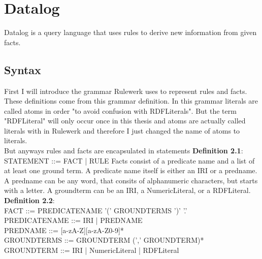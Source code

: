 \documentclass[hyperref, bachelorofscience]{cgvpub}
\renewenvironment{shaded}{%
  \def\FrameCommand{\fboxsep=\FrameSep \colorbox{shadecolor}}%
  \MakeFramed{\advance\hsize-\width \FrameRestore\FrameRestore}}%
 {\endMakeFramed}
\begin{document}
\section{Datalog}

Datalog is a query language that uses rules to derive new information from given facts. 
\subsection{Syntax}
First I will introduce the grammar Rulewerk uses to represent rules and facts. These definitions come from this \cite{MG2020} grammar definition. In this grammar literals are called atoms in order "to avoid confusion with RDFLiterals". But the term "RDFLiteral" will only occur once in this thesis and atoms are actually called literals with in Rulewerk and therefore I just changed the name of atoms to literals.  \\
But anyways rules and facts are encapsulated in statements 
\begin{shaded}
\textbf{Definition 2.1}: \\
STATEMENT ::= FACT | RULE
\end{shaded}
Facts consist of a predicate name and a list of at least one ground term. A predicate name itself is either an IRI
or a predname. A predname can be any word, that consits of alphanumeric characters, but starts with a letter. A groundterm can be an IRI, a NumericLiteral, or a RDFLiteral.
\begin{shaded}
\textbf{Definition 2.2}: \\
FACT                   ::= PREDICATENAME '(' GROUNDTERMS ')' '.' \\
PREDICATENAME          ::= IRI | PREDNAME \\
PREDNAME               ::= [a-zA-Z][a-zA-Z0-9]* \\
GROUNDTERMS            ::= GROUNDTERM (',' GROUNDTERM)* \\
GROUNDTERM             ::= IRI | NumericLiteral | RDFLiteral
\end{shaded}
\end{document}
